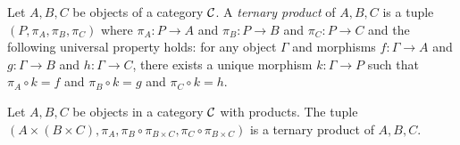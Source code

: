 

\begin{definition}
  Let \(A,B,C\) be objects of a category \(\mathcal C\).
  A \emph{ternary product} of \(A,B,C\)
  is a tuple \((P,\pi_A,\pi_B,\pi_C)\)
  where \(\pi_A : P\to A\) and \(\pi_B : P \to B\)
  and \(\pi_C : P \to C\)
  and the following universal property holds:
  for any object \(\Gamma\)
  and morphisms \(f : \Gamma \to A\)
  and \(g : \Gamma \to B\) and \(h : \Gamma \to C\),
  there exists a unique morphism \(k : \Gamma \to P\)
  such that \(\pi_A \circ k = f\)
  and \(\pi_B \circ k = g\) and \(\pi_C \circ k = h\).
\end{definition}

\begin{proposition}
  Let \(A,B,C\) be objects in a category \(\mathcal C\) with products.
  The tuple \((A\times (B\times C), \pi_A, \pi_B \circ \pi_{B\times C}, \pi_C \circ \pi_{B\times C})\)
  is a ternary product of \(A,B,C\).
\end{proposition}


